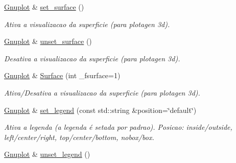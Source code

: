 \begin{DoxyCompactItemize}
\item 
\hypertarget{classGnuplot_a0e36dcd81618234c6cdd135a9e1eee2b}{\hyperlink{classGnuplot}{Gnuplot} \& \hyperlink{classGnuplot_a0e36dcd81618234c6cdd135a9e1eee2b}{set\-\_\-surface} ()}\label{classGnuplot_a0e36dcd81618234c6cdd135a9e1eee2b}

\begin{DoxyCompactList}\small\item\em Ativa a visualizacao da superficie (para plotagen 3d). \end{DoxyCompactList}\item 
\hypertarget{classGnuplot_a805f1807c9b3a0a6745d66fa1729e3be}{\hyperlink{classGnuplot}{Gnuplot} \& \hyperlink{classGnuplot_a805f1807c9b3a0a6745d66fa1729e3be}{unset\-\_\-surface} ()}\label{classGnuplot_a805f1807c9b3a0a6745d66fa1729e3be}

\begin{DoxyCompactList}\small\item\em Desativa a visualizacao da superficie (para plotagen 3d). \end{DoxyCompactList}\item 
\hypertarget{classGnuplot_a7b338ff4ec6c49659cd2022b68c0e861}{\hyperlink{classGnuplot}{Gnuplot} \& \hyperlink{classGnuplot_a7b338ff4ec6c49659cd2022b68c0e861}{Surface} (int \-\_\-fsurface=1)}\label{classGnuplot_a7b338ff4ec6c49659cd2022b68c0e861}

\begin{DoxyCompactList}\small\item\em Ativa/\-Desativa a visualizacao da superficie (para plotagen 3d). \end{DoxyCompactList}\item 
\hypertarget{classGnuplot_ad64a717dac18167f656c4f09239973f8}{\hyperlink{classGnuplot}{Gnuplot} \& \hyperlink{classGnuplot_ad64a717dac18167f656c4f09239973f8}{set\-\_\-legend} (const std\-::string \&position=\char`\"{}default\char`\"{})}\label{classGnuplot_ad64a717dac18167f656c4f09239973f8}

\begin{DoxyCompactList}\small\item\em Ativa a legenda (a legenda é setada por padrao). Posicao\-: inside/outside, left/center/right, top/center/bottom, nobox/box. \end{DoxyCompactList}\item 
\hypertarget{classGnuplot_a584e0710d7f5bcaa35653d1987f1563e}{\hyperlink{classGnuplot}{Gnuplot} \& \hyperlink{classGnuplot_a584e0710d7f5bcaa35653d1987f1563e}{unset\-\_\-legend} ()}\label{classGnuplot_a584e0710d7f5bcaa35653d1987f1563e}


\end{DoxyCompactItemize}
